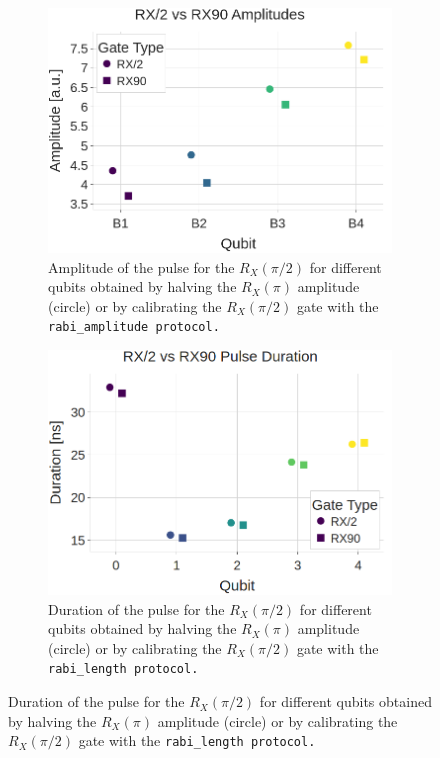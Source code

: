 \begin{figure}[h!]
    \centering
    \begin{subfigure}[t]{0.32\textwidth}
        \includegraphics[width=\textwidth]{figures/png/RX90/rabi_amplitude.png}
        \caption{Amplitude of the pulse for the $R_X(\pi/2)$ for different qubits obtained by halving the $R_X(\pi)$ amplitude (circle) or by calibrating the $R_X(\pi/2)$ gate with the \tt{rabi\_amplitude} protocol.}
        \label{fig:RX90_amplitude}
    \end{subfigure}
    \hfill
    \begin{subfigure}[t]{0.32\textwidth}
        \includegraphics[width=\textwidth]{figures/png/RX90/rabi_length.png}
        \caption{Duration of the pulse for the $R_X(\pi/2)$ for different qubits obtained by halving the $R_X(\pi)$ amplitude (circle) or by calibrating the $R_X(\pi/2)$ gate with the \tt{rabi\_length} protocol.}

\end{subfigure}
\end{figure}

